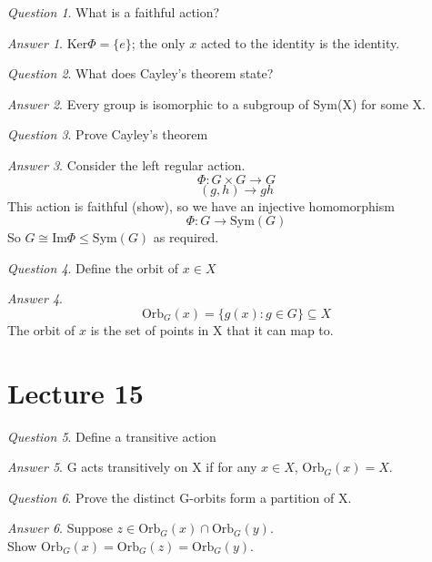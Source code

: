 \documentclass[]{article}
\theoremstyle{remark}
\theoremstyle{qnstyle}
\newtheorem{question}{Question}
\theoremstyle{answerstyle}
\newtheorem*{answer}{Answer}
\begin{document}
\begin{question}
    What is a faithful action?
\end{question}
\begin{answer}
    $\text{Ker}\Phi = \{e\}$; the only $x$ acted to the identity is the identity.
\end{answer}

\begin{question}
    What does Cayley's theorem state?
\end{question}
\begin{answer}
    Every group is isomorphic to a subgroup of Sym(X) for some X.
\end{answer}

\begin{question}
    Prove Cayley's theorem
\end{question}
\begin{answer}
    Consider the left regular action.
    $$\Phi: G \times G \to G$$
    $$(g,h) \to gh$$
    This action is faithful (show), so we have an injective homomorphism
    $$\Phi: G \to \text{Sym}(G)$$
    So $G \cong \text{Im}\Phi \leq \text{Sym}(G)$ as required.
\end{answer}

\begin{question}
    Define the orbit of $x \in X$
\end{question}
\begin{answer}
    $$\text{Orb}_G(x) = \{g(x): g \in G \} \subseteq X$$
    The orbit of $x$ is the set of points in X that it can map to.
\end{answer}

\section*{Lecture 15}

\begin{question}
    Define a transitive action
\end{question}
\begin{answer}
    G acts transitively on X if for any $x \in X$, $\text{Orb}_G(x) = X$.
\end{answer}

\begin{question}
    Prove the distinct G-orbits form a partition of X.
\end{question}
\begin{answer}
    Suppose $z \in \text{Orb}_G(x) \cap \text{Orb}_G(y)$.\\
    Show $ \text{Orb}_G(x) = \text{Orb}_G(z) = \text{Orb}_G(y)$.
\end{answer}
\end{document}
